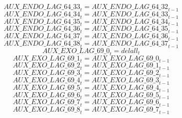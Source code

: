\begin{dmath}
{AUX\_ENDO\_LAG\_64\_33}_{t}={AUX\_ENDO\_LAG\_64\_32}_{t-1}
\end{dmath}
\begin{dmath}
{AUX\_ENDO\_LAG\_64\_34}_{t}={AUX\_ENDO\_LAG\_64\_33}_{t-1}
\end{dmath}
\begin{dmath}
{AUX\_ENDO\_LAG\_64\_35}_{t}={AUX\_ENDO\_LAG\_64\_34}_{t-1}
\end{dmath}
\begin{dmath}
{AUX\_ENDO\_LAG\_64\_36}_{t}={AUX\_ENDO\_LAG\_64\_35}_{t-1}
\end{dmath}
\begin{dmath}
{AUX\_ENDO\_LAG\_64\_37}_{t}={AUX\_ENDO\_LAG\_64\_36}_{t-1}
\end{dmath}
\begin{dmath}
{AUX\_ENDO\_LAG\_64\_38}_{t}={AUX\_ENDO\_LAG\_64\_37}_{t-1}
\end{dmath}
\begin{dmath}
{AUX\_EXO\_LAG\_69\_0}_{t}={delall}_{t}
\end{dmath}
\begin{dmath}
{AUX\_EXO\_LAG\_69\_1}_{t}={AUX\_EXO\_LAG\_69\_0}_{t-1}
\end{dmath}
\begin{dmath}
{AUX\_EXO\_LAG\_69\_2}_{t}={AUX\_EXO\_LAG\_69\_1}_{t-1}
\end{dmath}
\begin{dmath}
{AUX\_EXO\_LAG\_69\_3}_{t}={AUX\_EXO\_LAG\_69\_2}_{t-1}
\end{dmath}
\begin{dmath}
{AUX\_EXO\_LAG\_69\_4}_{t}={AUX\_EXO\_LAG\_69\_3}_{t-1}
\end{dmath}
\begin{dmath}
{AUX\_EXO\_LAG\_69\_5}_{t}={AUX\_EXO\_LAG\_69\_4}_{t-1}
\end{dmath}
\begin{dmath}
{AUX\_EXO\_LAG\_69\_6}_{t}={AUX\_EXO\_LAG\_69\_5}_{t-1}
\end{dmath}
\begin{dmath}
{AUX\_EXO\_LAG\_69\_7}_{t}={AUX\_EXO\_LAG\_69\_6}_{t-1}
\end{dmath}
\begin{dmath}
{AUX\_EXO\_LAG\_69\_8}_{t}={AUX\_EXO\_LAG\_69\_7}_{t-1}
\end{dmath}
